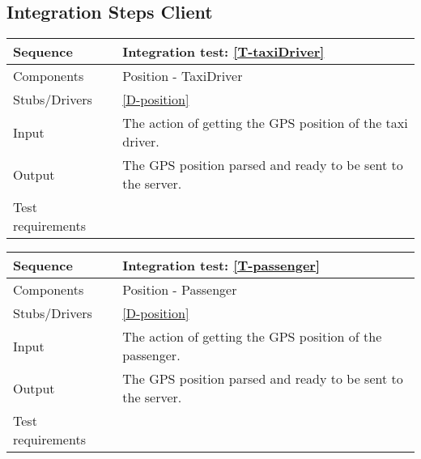 \subsection{Integration Steps Client}

\begin{table}[H]
    \begin{tabularx}{\textwidth}{l|X}
        \hline
        Sequence
        & 
        Integration test: \ref{T-taxiDriver}
        \\ \hline
        Components 
        & 
        Position - TaxiDriver
        \\ \hline
        Stubs/Drivers 
        & 
        \ref{D-position}
        \\ \hline
        Input 
        & 
        The action of getting the GPS position of the taxi driver.
        \\ \hline
        Output 
        & 
        The GPS position parsed and ready to be sent to the server.
        \\ \hline
        Test requirements 
        & 
        
        \\ \hline
    \end{tabularx}
\end{table}

\begin{table}[H]
    \begin{tabularx}{\textwidth}{l|X}
        \hline
        Sequence
        & 
        Integration test: \ref{T-passenger}
        \\ \hline
        Components 
        & 
        Position - Passenger
        \\ \hline
        Stubs/Drivers 
        & 
        \ref{D-position}
        \\ \hline
        Input 
        & 
        The action of getting the GPS position of the passenger.
        \\ \hline
        Output 
        & 
        The GPS position parsed and ready to be sent to the server.
        \\ \hline
        Test requirements 
        & 
        
        \\ \hline
    \end{tabularx}
\end{table}

